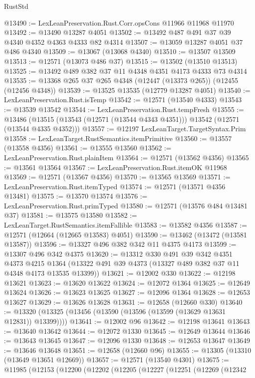 \begin{lexlean}{RustStd}
\begin{coremodule}
@13490 := LexLeanPreservation.Rust.Corr.opsCons @11966 @11968 @11970
@13492 := @13490 @13287 @4051
@13502 := @13492 @487 @491 @37 @39 @4340 @4352 @4363 @4333 @82 @4314
@13507 := @13059 @13287 @4051 @37 @486 @4340
@13509 := @13067 (@13068 @4340)
@13510 := @13507 @13509
@13513 := @12571 (@13073 @486 @37)
@13515 := @13502 (@13510 @13513)
@13525 := @13492 @489 @382 @37 @11 @4348 @4351 @4173 @4333 @73 @4314
@13535 := @13368 @265 @37 @265 @4348 (@12447 (@13373 @265)) (@12455 (@12456 @4348))
@13539 := @13525 @13535 (@12779 @13287 @4051)
@13540 := LexLeanPreservation.Rust.isTemp
@13542 := @12571 (@13540 @4333)
@13543 := @13539 @13542
@13544 := LexLeanPreservation.Rust.tempFresh
@13555 := @13486
    (@13515 (@13543 (@12571 (@13544 @4343 @4351))) @13542 (@12571 (@13544 @4335 @4352)))
@13557 := @12197 LexLeanTarget.TargetSyntax.Prim
@13558 := LexLeanTarget.RustSemantics.itemPrimitive
@13560 := @13557 (@13558 @4356)
@13561 := @13555 @13560
@13562 := LexLeanPreservation.Rust.plainItem
@13564 := @12571 (@13562 @4356)
@13565 := @13561 @13564
@13567 := LexLeanPreservation.Rust.itemOK @11968
@13569 := @12571 (@13567 @4356)
@13570 := @13565 @13569
@13571 := LexLeanPreservation.Rust.itemTyped
@13574 := @12571 (@13571 @4356 @13481)
@13575 := @13570 @13574
@13576 := LexLeanPreservation.Rust.primTyped
@13580 := @12571 (@13576 @484 @13481 @37)
@13581 := @13575 @13580
@13582 := LexLeanTarget.RustSemantics.itemFallible
@13583 := @13582 @4356
@13587 := @12571 (@12664 (@12665 @13583) @4051)
@13590 := @13462 (@13472 (@13581 @13587))
@13596 := @13327 @496 @382 @342 @11 @4375 @4173
@13599 := @13307 @496 @342 @4375
@13620 := @13312
    @330
    @491
    @39
    @342
    @4351
    @4373
    @4215
    @1364
    (@13322 @491 @39 @4373 (@13327 @489 @382 @37 @11 @4348 @4173 @13535 @13399))
@13621 := @12002 @330
@13622 := @12198 @13621
@13623 := @13620 @13622
@13624 := @12072 @1364
@13625 := @12649 @13624
@13626 := @13623 @13625
@13627 := @12096 @1364
@13628 := @12653 @13627
@13629 := @13626 @13628
@13631 := @12658 (@12660 @330)
@13640 := @13320 (@13325 (@13456 (@13590 (@13596 (@13599 (@13629 @13631 @12831)) @13399))))
@13641 := @12002 @96
@13642 := @12198 @13641
@13643 := @13640 @13642
@13644 := @12072 @1330
@13645 := @12649 @13644
@13646 := @13643 @13645
@13647 := @12096 @1330
@13648 := @12653 @13647
@13649 := @13646 @13648
@13651 := @12658 (@12660 @96)
@13655 := @13305 (@13310 (@13649 @13651 @12669))
@13657 := @12571 (@13540 @4301)
@13675 := @11985
    (@12153
      (@12200
        (@12202
          (@12205
            (@12227
              (@12251
                (@12269
                  (@12342

\end{coremodule}
\end{lexlean}
